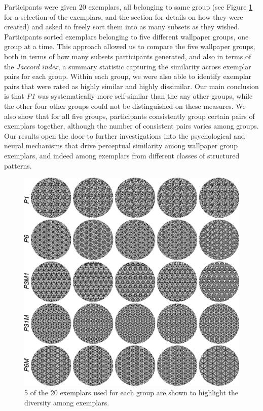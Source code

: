 \documentclass[11pt, twoside]{article}
\begin{document}
Participants were given 20 exemplars, all belonging to same group (see Figure \ref{fig:wpg_exemplars} for a selection of the exemplars, and the  section for details on how they were created) and asked to freely sort them into as many subsets as they wished. Participants sorted exemplars belonging to five different wallpaper groups, one group at a time. This approach allowed us to compare the five wallpaper groups, both in terms of how many subsets participants generated, and also in terms of the \textit{Jaccard index}, a summary statistic capturing the similarity across exemplar pairs for each group. Within each group, we were also able to identify exemplar pairs that were rated as highly similar and highly dissimilar. Our main conclusion is that \textit{P1} was systematically more self-similar than the any other groups, while the other four other groups could not be distinguished on these measures. We also show that for all five groups, participants consistently group certain pairs of exemplars together, although the number of consistent pairs varies among groups. Our results open the door to further investigations into the psychological and neural mechanisms that drive perceptual similarity among wallpaper group exemplars, and indeed among exemplars from different classes of structured patterns. 

\begin{figure}[H]
	\centering
	\includegraphics[width=\linewidth]{./figures//wpg_exemplars.pdf}
	\caption{5 of the 20 exemplars used for each group are shown to highlight the diversity among exemplars.}
	\label{fig:wpg_exemplars}
\end{figure}
\end{document}
